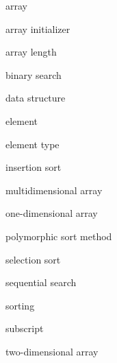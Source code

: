 

\begin{KT}
array

array \break initializer

array length

binary search

data structure 

element

element type

insertion sort

multidimensional array

one-dimensional \break array

polymorphic sort method

selection sort

sequential search

sorting

subscript

two-dimensional array

\end{KT}


